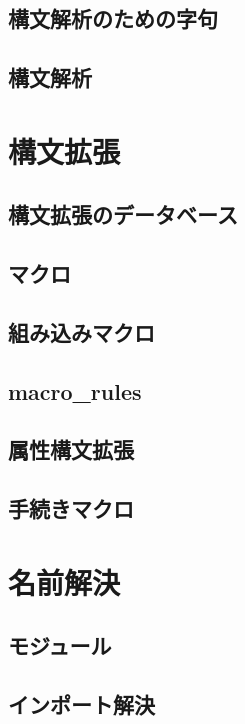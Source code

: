 \documentclass[dvipdfmx,uplatex,papersize,a4paper,10pt]{jsbook}
\theoremstyle{definition}
\begin{document}
\section{構文解析のための字句}

\section{構文解析}



\chapter{構文拡張}

\section{構文拡張のデータベース}

\section{マクロ}

\section{組み込みマクロ}

\section{macro\_rules}

\section{属性構文拡張}

\section{手続きマクロ}



\chapter{名前解決}

\section{モジュール}

\section{インポート解決}
\end{document}
